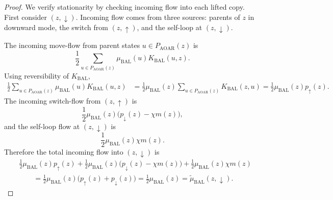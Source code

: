 \documentclass{article}
\numberwithin{theorem}{section}
\numberwithin{proposition}{section}
\numberwithin{corollary}{section}
\numberwithin{lemma}{section}
\numberwithin{conjecture}{section}
\numberwithin{remark}{section}
\numberwithin{definition}{section}
\numberwithin{assumption}{section}
\numberwithin{example}{section}
\begin{document}
\begin{proof}
We verify stationarity by checking incoming flow into each lifted copy. First consider $(z,\downarrow)$. Incoming flow comes from three sources: parents of $z$ in downward mode, the switch from $(z,\uparrow)$, and the self-loop at $(z,\downarrow)$.

The incoming move-flow from parent states $u\in P_{\mathrm{AOAR}}(z)$ is
\begin{equation*}
    \frac12\sum_{u\in P_{\mathrm{AOAR}}(z)}\mu_{\mathrm{BAL}}(u)K_{\mathrm{BAL}}(u,z).
\end{equation*}
Using reversibility of $K_{\mathrm{BAL}}$,
\begin{align*}
    \frac12\sum_{u\in P_{\mathrm{AOAR}}(z)}\mu_{\mathrm{BAL}}(u)K_{\mathrm{BAL}}(u,z)
    &=
    \frac12\mu_{\mathrm{BAL}}(z)\sum_{u\in P_{\mathrm{AOAR}}(z)}K_{\mathrm{BAL}}(z,u)=
    \frac12\mu_{\mathrm{BAL}}(z)p_{\uparrow}(z).
\end{align*}
The incoming switch-flow from $(z,\uparrow)$ is
\begin{equation*}
    \frac12\mu_{\mathrm{BAL}}(z)\bigl(p_{\downarrow}(z)-\chi m(z)\bigr),
\end{equation*}
and the self-loop flow at $(z,\downarrow)$ is
\begin{equation*}
    \frac12\mu_{\mathrm{BAL}}(z)\chi m(z).
\end{equation*}
Therefore the total incoming flow into $(z,\downarrow)$ is
\begin{align*}
    &\frac12\mu_{\mathrm{BAL}}(z)p_{\uparrow}(z)
    +\frac12\mu_{\mathrm{BAL}}(z)\bigl(p_{\downarrow}(z)-\chi m(z)\bigr)
    +\frac12\mu_{\mathrm{BAL}}(z)\chi m(z)\\
    &\qquad=
    \frac12\mu_{\mathrm{BAL}}(z)\bigl(p_{\uparrow}(z)+p_{\downarrow}(z)\bigr)
    =
    \frac12\mu_{\mathrm{BAL}}(z)=\widetilde\mu_{\mathrm{BAL}}(z,\downarrow).
\end{align*}


\end{proof}
\end{document}
